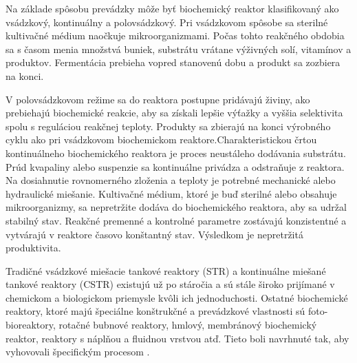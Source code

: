 Na základe spôsobu prevádzky môže byť biochemický reaktor klasifikovaný ako vsádzkový, kontinuálny a polovsádzkový. 
Pri vsádzkovom spôsobe sa sterilné kultivačné médium naočkuje mikroorganizmami. Počas tohto reakčného obdobia sa s časom menia množstvá buniek, substrátu vrátane výživných solí, vitamínov a produktov. Fermentácia prebieha vopred stanovenú dobu a produkt sa zozbiera na konci.

V polovsádzkovom režime sa do reaktora postupne pridávajú živiny, ako prebiehajú biochemické reakcie, aby sa získali lepšie výťažky a vyššia selektivita spolu s reguláciou reakčnej teploty. Produkty sa zbierajú na konci výrobného cyklu ako pri vsádzkovom biochemickom reaktore.Charakteristickou črtou kontinuálneho biochemického reaktora je proces neustáleho dodávania substrátu. Prúd kvapaliny alebo suspenzie sa kontinuálne privádza a odstraňuje z reaktora. Na dosiahnutie rovnomerného zloženia a teploty je potrebné mechanické alebo hydraulické miešanie. Kultivačné médium, ktoré je buď sterilné alebo obsahuje mikroorganizmy, sa nepretržite dodáva do biochemického reaktora, aby sa udržal stabilný stav. Reakčné premenné a kontrolné parametre zostávajú konzistentné a vytvárajú v reaktore časovo konštantný stav. Výsledkom je nepretržitá produktivita.

Tradičné vsádzkové miešacie tankové reaktory (STR) a kontinuálne miešané tankové reaktory (CSTR) existujú už po stáročia a sú stále široko prijímané v chemickom a biologickom priemysle kvôli ich jednoduchosti. Ostatné biochemické reaktory, ktoré majú špeciálne konštrukčné a prevádzkové vlastnosti sú foto-bioreaktory, rotačné bubnové reaktory, hmlový, membránový biochemický reaktor, reaktory s náplňou a fluidnou vrstvou atď. Tieto boli navrhnuté tak, aby vyhovovali špecifickým procesom \cite{ref1}.
